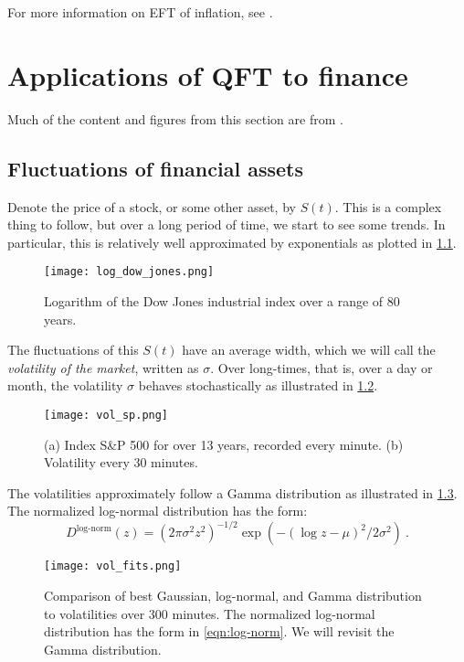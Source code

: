 \documentclass{booc}
\begin{document}
For more information on EFT of inflation, see 
\cites{baumann_inflation_1,baumann_inflation_2,burgess_inflation}.
\chapter{Applications of QFT to finance}

Much of the content and figures from this section are from \cite{kleinert_finance}.

\section{Fluctuations of financial assets}

Denote the price of a stock, or some other asset, by $S\left( t \right)$. 
This is a complex thing to follow, but over a long period of time, we start to see some trends. 
In particular, this is relatively well approximated by exponentials as plotted in 
\cref{fig:log_dow}.
\begin{figure}
\centering
\texttt{[image: log\_dow\_jones.png]}
\caption{Logarithm of the Dow Jones industrial index over a range of 80 years.}
\label{fig:log_dow}
\end{figure}
The fluctuations of this $S\left( t \right)$
have an average width, which we will call the \emph{volatility of the market}, 
written as $\sigma$. Over long-times, that is, over a day or month,
the volatility $\sigma$ behaves stochastically as illustrated in \cref{fig:vol_sp}.
\begin{figure}
\centering
\texttt{[image: vol\_sp.png]}
\caption{(a) Index S\&P 500 for over 13 years, recorded every minute.
(b) Volatility every 30 minutes.}
\label{fig:vol_sp}
\end{figure}
The volatilities approximately follow a Gamma distribution as illustrated in 
\cref{fig:vol_fits}.
The normalized log-normal distribution has the form:
\begin{equation}
D^{\text{log-norm}}\left( z \right) = 
\left( 2\pi \sigma^2 z^2 \right)^{-1/2}\exp\left( 
-\left( \log z - \mu \right)^2 / 2\sigma^2 \right) \ .
\label{eqn:log-norm}
\end{equation}

\begin{figure}
\centering
\texttt{[image: vol\_fits.png]}
\caption{Comparison of best Gaussian, log-normal, and
Gamma distribution to volatilities over 300 minutes. 
The normalized log-normal distribution has the form
in \eqref{eqn:log-norm}.
We will revisit the Gamma distribution.}
\label{fig:vol_fits}
\end{figure}
\end{document}
